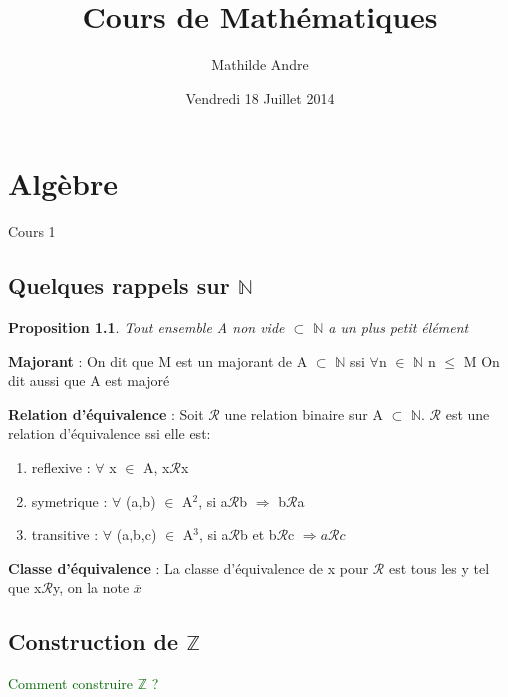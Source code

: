 \documentclass[12pt]{report}
\title{Cours de Math\'ematiques}
\author{Mathilde Andre}
\date{Vendredi 18 Juillet 2014}
\theoremstyle{break}%
\newtheorem{maprop}{Proposition}[chapter]
\begin{document}
\maketitle
\renewcommand{\contentsname}{Sommaire}
\tableofcontents


 



\chapter{Alg\`ebre}
Cours 1
\section{Quelques rappels sur $\mathbb{N}$}
\begin{maprop}
	Tout ensemble A non vide $\subset$ $\mathbb{N}$ a un plus petit \'el\'ement
\end{maprop}
\begin{madef}
	\textbf {Majorant} : On dit que M est un majorant de A $\subset$ $\mathbb{N}$ ssi $\forall$n $\in$ $\mathbb{N}$ n $\le$ M 
	\newline
	On dit aussi que A est major\'e
\end{madef}
\begin{madef}
	\textbf {Relation d'\'equivalence} : Soit $\mathcal{R}$ une relation binaire sur A $\subset$ $\mathbb{N}$. \newline
	$\mathcal{R}$ est une relation d'\'equivalence ssi elle est:
	\begin{enumerate}
		\item reflexive :  $\forall$ x $\in$ A, x$\mathcal{R}$x 
		\item symetrique : $\forall$ (a,b) $\in$ A$^2$, si a$\mathcal{R}$b $\Rightarrow$ b$\mathcal{R}$a  
		\item transitive : $\forall$ (a,b,c) $\in$ A$^3$, si a$\mathcal{R}$b et b$\mathcal{R}$c $\Rightarrow a\mathcal{R}c$
	\end{enumerate}

	\textbf {Classe d'\'equivalence} : La classe d'\'equivalence de x pour $\mathcal{R}$ est tous les y tel que x$\mathcal{R}$y, on la note $\overline{x}$

\end{madef}




\section{Construction de $\mathbb{Z}$} 
\textcolor{darkgreen}{Comment construire $\mathbb{Z}$ ? }
\end{document}
